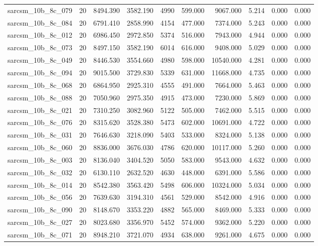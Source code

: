 \begin{tabular}{lrrrrrrrrr}
sarcsm\_10b\_8c\_079 & 20 & 8494.390 & 3582.190 & 4990 & 599.000 & 9067.000 & 5.214 & 0.000 & 0.000 \\
sarcsm\_10b\_8c\_084 & 20 & 6791.410 & 2858.990 & 4154 & 477.000 & 7374.000 & 5.243 & 0.000 & 0.000 \\
sarcsm\_10b\_8c\_012 & 20 & 6986.450 & 2972.850 & 5374 & 516.000 & 7943.000 & 4.944 & 0.000 & 0.000 \\
sarcsm\_10b\_8c\_073 & 20 & 8497.150 & 3582.190 & 6014 & 616.000 & 9408.000 & 5.029 & 0.000 & 0.000 \\
sarcsm\_10b\_8c\_049 & 20 & 8446.530 & 3554.660 & 4980 & 598.000 & 10540.000 & 4.281 & 0.000 & 0.000 \\
sarcsm\_10b\_8c\_094 & 20 & 9015.500 & 3729.830 & 5339 & 631.000 & 11668.000 & 4.735 & 0.000 & 0.000 \\
sarcsm\_10b\_8c\_068 & 20 & 6864.950 & 2925.310 & 4555 & 491.000 & 7664.000 & 5.463 & 0.000 & 0.000 \\
sarcsm\_10b\_8c\_088 & 20 & 7050.960 & 2975.350 & 4915 & 473.000 & 7230.000 & 5.869 & 0.000 & 0.000 \\
sarcsm\_10b\_8c\_021 & 20 & 7310.250 & 3082.960 & 5122 & 505.000 & 7462.000 & 5.515 & 0.000 & 0.000 \\
sarcsm\_10b\_8c\_076 & 20 & 8315.620 & 3528.380 & 5473 & 602.000 & 10691.000 & 4.722 & 0.000 & 0.000 \\
sarcsm\_10b\_8c\_031 & 20 & 7646.630 & 3218.090 & 5403 & 533.000 & 8324.000 & 5.138 & 0.000 & 0.000 \\
sarcsm\_10b\_8c\_060 & 20 & 8836.000 & 3676.030 & 4786 & 620.000 & 10117.000 & 5.260 & 0.000 & 0.000 \\
sarcsm\_10b\_8c\_003 & 20 & 8136.040 & 3404.520 & 5050 & 583.000 & 9543.000 & 4.632 & 0.000 & 0.000 \\
sarcsm\_10b\_8c\_032 & 20 & 6130.110 & 2632.520 & 4630 & 448.000 & 6391.000 & 5.586 & 0.000 & 0.000 \\
sarcsm\_10b\_8c\_014 & 20 & 8542.380 & 3563.420 & 5498 & 606.000 & 10324.000 & 5.034 & 0.000 & 0.000 \\
sarcsm\_10b\_8c\_056 & 20 & 7639.630 & 3194.310 & 4561 & 529.000 & 8542.000 & 4.916 & 0.000 & 0.000 \\
sarcsm\_10b\_8c\_090 & 20 & 8148.670 & 3353.220 & 4882 & 565.000 & 8469.000 & 5.333 & 0.000 & 0.000 \\
sarcsm\_10b\_8c\_027 & 20 & 8023.680 & 3356.970 & 5452 & 574.000 & 9362.000 & 5.220 & 0.000 & 0.000 \\
sarcsm\_10b\_8c\_071 & 20 & 8948.210 & 3721.070 & 4934 & 638.000 & 9261.000 & 4.675 & 0.000 & 0.000 \\

\end{tabular}
